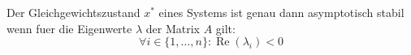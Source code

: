 Der Gleichgewichtszustand $x^*$ eines Systems ist genau dann asymptotisch stabil wenn fuer die Eigenwerte $\lambda$ der Matrix $A$ gilt:
$$\forall i \in \{1, \dots, n\}: \operatorname{Re}(\lambda_i) < 0$$
